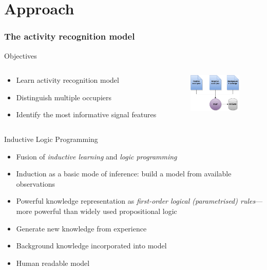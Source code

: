 \documentclass[10pt]{beamer}
\begin{document}
\section{Approach}

\begin{frame}[plain]
  \frametitle{The activity recognition model}

    \begin{block}{Objectives}
    \begin{columns}
      \begin{column}{8cm}
      \begin{itemize}
        \item Learn activity recognition model
        \item Distinguish multiple occupiers
        \item Identify the most informative signal features
      \end{itemize}
      \end{column}

    \begin{column}{2cm}
      \hspace*{-1cm}\includegraphics[width=2.5cm]{../paper/gfx/ilp}
    \end{column}

    \end{columns}
    \end{block}

    \begin{block}{Inductive Logic Programming~\cite{muggleton1994inductive,muggleton1995inverse}}
      \begin{itemize}
        \item Fusion of \emph{inductive learning} and \emph{logic programming}
        \item Induction as a basic mode of inference: build a model from available observations
        \item Powerful knowledge representation as \emph{first-order logical (parametrised) rules}---more powerful than widely used propositional logic

        \item Generate new knowledge from experience
        \item Background knowledge incorporated into model
        \item Human readable model
      \end{itemize}
    \end{block}

\end{frame}
\end{document}

